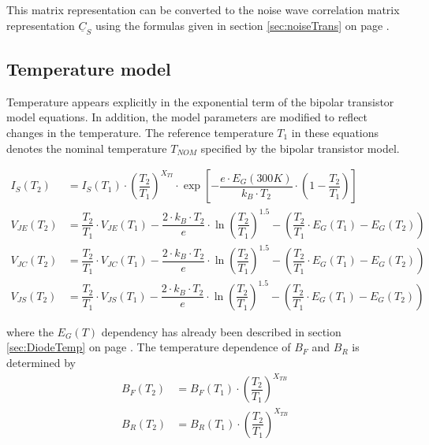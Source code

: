 This matrix representation can be converted to the noise wave
correlation matrix representation $\underline{C}_S$ using the formulas
given in section \ref{sec:noiseTrans} on page
\pageref{sec:noiseTrans}.

\subsection{Temperature model}

Temperature appears explicitly in the exponential term of the bipolar
transistor model equations.  In addition, the model parameters are
modified to reflect changes in the temperature.  The reference
temperature $T_1$ in these equations denotes the nominal temperature
$T_{NOM}$ specified by the bipolar transistor model.

\begin{align}
I_S\left(T_2\right) &= I_S\left(T_1\right)\cdot \left(\dfrac{T_2}{T_1}\right)^{X_{TI}} \cdot \exp{\left[-\dfrac{e\cdot E_G\left(300K\right)}{k_B\cdot T_2}\cdot \left(1 - \dfrac{T_2}{T_1}\right)\right]}\\
V_{JE}\left(T_2\right)  &= \dfrac{T_2}{T_1}\cdot V_{JE}\left(T_1\right) - \dfrac{2\cdot k_B\cdot T_2}{e} \cdot \ln{\left(\dfrac{T_2}{T_1}\right)^{1.5}} - \left(\dfrac{T_2}{T_1} \cdot E_G\left(T_1\right) - E_G\left(T_2\right)\right)\\
V_{JC}\left(T_2\right)  &= \dfrac{T_2}{T_1}\cdot V_{JC}\left(T_1\right) - \dfrac{2\cdot k_B\cdot T_2}{e} \cdot \ln{\left(\dfrac{T_2}{T_1}\right)^{1.5}} - \left(\dfrac{T_2}{T_1} \cdot E_G\left(T_1\right) - E_G\left(T_2\right)\right)\\
V_{JS}\left(T_2\right)  &= \dfrac{T_2}{T_1}\cdot V_{JS}\left(T_1\right) - \dfrac{2\cdot k_B\cdot T_2}{e} \cdot \ln{\left(\dfrac{T_2}{T_1}\right)^{1.5}} - \left(\dfrac{T_2}{T_1} \cdot E_G\left(T_1\right) - E_G\left(T_2\right)\right)
\end{align}

where the $E_G\left(T\right)$ dependency has already been described in
section \ref{sec:DiodeTemp} on page \pageref{sec:DiodeTemp}.  The
temperature dependence of $B_F$ and $B_R$ is determined by
\begin{align}
B_F\left(T_2\right) &= B_F\left(T_1\right)\cdot \left(\dfrac{T_2}{T_1}\right)^{X_{TB}}\\
B_R\left(T_2\right) &= B_R\left(T_1\right)\cdot \left(\dfrac{T_2}{T_1}\right)^{X_{TB}}
\end{align}


